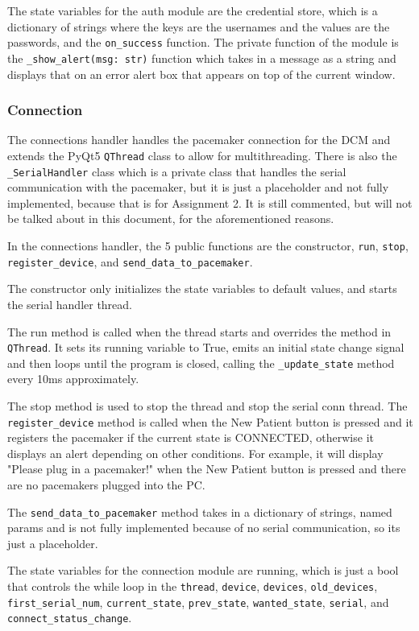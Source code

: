 \documentclass[12pt]{article}
\begin{document}
The state variables for the auth module are the credential store, which is a dictionary of strings where the keys are the usernames and the values are the passwords, and the \verb|on_success| function. The private function of the module is the \verb|_show_alert(msg: str)| function which takes in a message as a string and displays that on an error alert box that appears on top of the current window.

\subsubsection{Connection}
The connections handler handles the pacemaker connection for the DCM and extends the PyQt5 \verb|QThread| class to allow for multithreading.
There is also the \verb|_SerialHandler| class which is a private class that handles the serial communication with the pacemaker, but it is just a placeholder and not fully implemented, because that is for Assignment 2.
It is still commented, but will not be talked about in this document, for the aforementioned reasons.

In the connections handler, the 5 public functions are the constructor, \verb|run|, \verb|stop|, \\ \verb|register_device|, and \verb|send_data_to_pacemaker|. 

The constructor only initializes the state variables to default values, and starts the serial handler thread.

The run method is called when the thread starts and overrides the method in \verb|QThread|. It sets its running variable to True, emits an initial state change signal and then loops until the program is closed, calling the \verb|_update_state| method every 10ms approximately.

The stop method is used to stop the thread and stop the serial conn thread.
The \\ \verb|register_device| method is called when the New Patient button is pressed and it registers the pacemaker if the current state is CONNECTED, otherwise it displays an alert depending on other conditions.
For example, it will display "Please plug in a pacemaker!" when the New Patient button is pressed and there are no pacemakers plugged into the PC.

The \verb|send_data_to_pacemaker| method takes in a dictionary of strings, named params and is not fully implemented because of no serial communication, so its just a placeholder.

The state variables for the connection module are running, which is just a bool that controls the while loop in the \verb|thread|, \verb|device|, \verb|devices|, \verb|old_devices|, \verb|first_serial_num|, \verb|current_state|, \verb|prev_state|, \verb|wanted_state|, \verb|serial|, and \verb|connect_status_change|.
\end{document}

